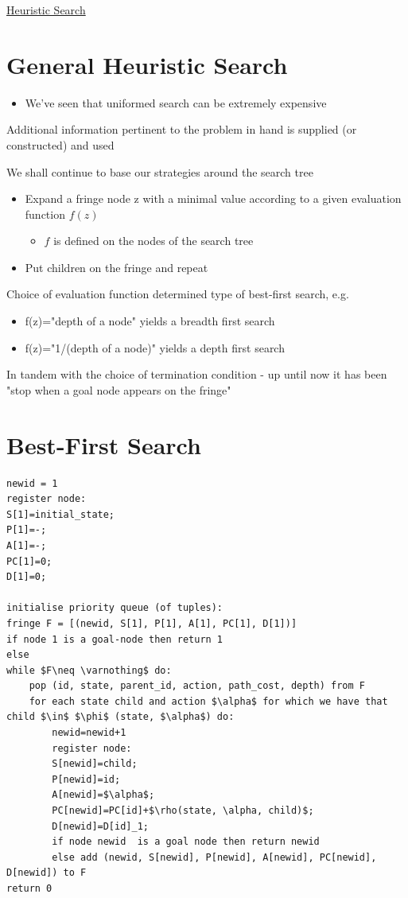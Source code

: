 \documentclass{article}[18pt]
\begin{document}
\begin{center}
\underline{\huge Heuristic Search}
\end{center}
\section{General Heuristic Search}
\begin{itemize}
	\item We've seen that uniformed search can be extremely expensive
\end{itemize}
\begin{defin}
	Additional information pertinent to the problem in hand is supplied (or constructed) and used
\end{defin}
We shall continue to base our strategies around the search tree
\begin{defin}
\begin{itemize}
	\item Expand a fringe node z with a minimal value according to a given evaluation function $f(z)$
	\begin{itemize}
		\item $f$ is defined on the nodes of the search tree
	\end{itemize}
	\item Put children on the fringe and repeat
\end{itemize}
\end{defin}
Choice of evaluation function determined type of best-first search, e.g.
\begin{itemize}
	\item f(z)="depth of a node" yields a breadth first search
	\item f(z)="1/(depth of a node)" yields a depth first search 
\end{itemize}
In tandem with the choice of termination condition - up until now it has been "stop when a goal node appears on the fringe"
\section{Best-First Search}
\begin{lstlisting}[mathescape=true, tabsize=2]
newid = 1
register node:
S[1]=initial_state;
P[1]=-;
A[1]=-;
PC[1]=0;
D[1]=0;

initialise priority queue (of tuples):
fringe F = [(newid, S[1], P[1], A[1], PC[1], D[1])]
if node 1 is a goal-node then return 1
else
while $F\neq \varnothing$ do:
	pop (id, state, parent_id, action, path_cost, depth) from F
	for each state child and action $\alpha$ for which we have that child $\in$ $\phi$ (state, $\alpha$) do:
		newid=newid+1
		register node:
		S[newid]=child;
		P[newid]=id;
		A[newid]=$\alpha$;
		PC[newid]=PC[id]+$\rho(state, \alpha, child)$;
		D[newid]=D[id]_1;
		if node newid  is a goal node then return newid
		else add (newid, S[newid], P[newid], A[newid], PC[newid], D[newid]) to F
return 0
\end{lstlisting}
\end{document}

